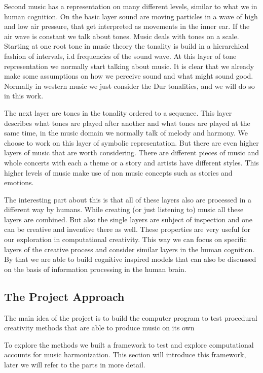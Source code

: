 Second music has a representation on many different levels, similar to what we in human cognition. On the basic layer sound are moving particles in a wave of high and low air pressure, that get interpreted as movements in the inner ear. If the air wave is constant we talk about tones. Music deals with tones on a scale. Starting at one root tone in music theory the tonality is build in a hierarchical fashion of intervals, i.d frequencies of the sound wave. At this layer of tone representation we normally start talking about music. It is clear that we already make some assumptions on how we perceive sound and what might sound good. Normally in western music we just consider the Dur tonalities, and we will do so in this work. 

The next layer are tones in the tonality ordered to a sequence. This layer describes what tones are played after another and what tones are played at the same time, in the music domain we normally talk of melody and harmony. We choose to work on this layer of symbolic representation. But there are even higher layers of music that are worth considering. There are different pieces of music and whole concerts with each a theme or a story and artists have different styles. This higher levels of music make use of non music concepts such as stories and emotions. 

The interesting part about this is that all of these layers also are processed in a different way by humans. While creating (or just listening to) music all these layers are combined. But also the single layers are subject of inspection and one can be creative and inventive there as well. These properties are very useful for our exploration in computational creativity. This way we can focus on specific layers of the creative process and consider similar layers in the human cognition. By that we are able to build cognitive inspired models that can also be discussed on the basis of information processing in the human brain. 

\subsection{The Project Approach}
The main idea of the project is to build the computer program to test procedural creativity methods that are able to produce music on its own 

To explore the methods we built a framework to test and explore computational accounts for music harmonization. This section will introduce this framework, later we will refer to the parts in more detail.

